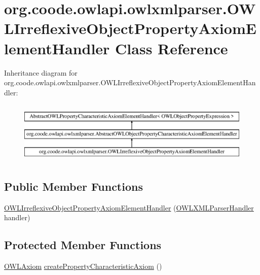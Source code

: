 \hypertarget{classorg_1_1coode_1_1owlapi_1_1owlxmlparser_1_1_o_w_l_irreflexive_object_property_axiom_element_handler}{\section{org.\-coode.\-owlapi.\-owlxmlparser.\-O\-W\-L\-Irreflexive\-Object\-Property\-Axiom\-Element\-Handler Class Reference}
\label{classorg_1_1coode_1_1owlapi_1_1owlxmlparser_1_1_o_w_l_irreflexive_object_property_axiom_element_handler}
}
Inheritance diagram for org.\-coode.\-owlapi.\-owlxmlparser.\-O\-W\-L\-Irreflexive\-Object\-Property\-Axiom\-Element\-Handler\-:\begin{figure}[H]
\begin{center}
\leavevmode
\includegraphics[height=2.984014cm]{classorg_1_1coode_1_1owlapi_1_1owlxmlparser_1_1_o_w_l_irreflexive_object_property_axiom_element_handler}
\end{center}
\end{figure}
\subsection*{Public Member Functions}
\begin{DoxyCompactItemize}
\item 
\hyperlink{classorg_1_1coode_1_1owlapi_1_1owlxmlparser_1_1_o_w_l_irreflexive_object_property_axiom_element_handler_a30731316447177d464994be2b184adb1}{O\-W\-L\-Irreflexive\-Object\-Property\-Axiom\-Element\-Handler} (\hyperlink{classorg_1_1coode_1_1owlapi_1_1owlxmlparser_1_1_o_w_l_x_m_l_parser_handler}{O\-W\-L\-X\-M\-L\-Parser\-Handler} handler)
\end{DoxyCompactItemize}
\subsection*{Protected Member Functions}
\begin{DoxyCompactItemize}
\item 
\hyperlink{interfaceorg_1_1semanticweb_1_1owlapi_1_1model_1_1_o_w_l_axiom}{O\-W\-L\-Axiom} \hyperlink{classorg_1_1coode_1_1owlapi_1_1owlxmlparser_1_1_o_w_l_irreflexive_object_property_axiom_element_handler_a04b3dfde2f7fbae73af78f16bac916f7}{create\-Property\-Characteristic\-Axiom} ()
\end{DoxyCompactItemize}


